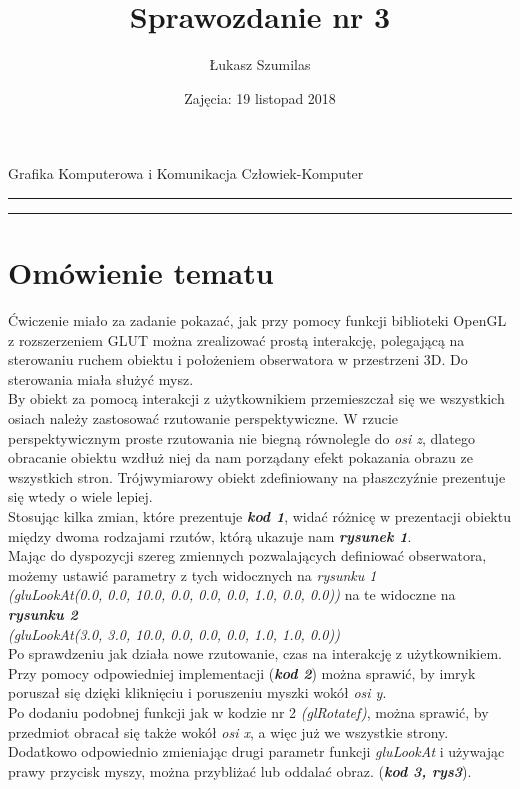 \documentclass[a4paper,11pt]{article}
\title{Sprawozdanie nr 3}
\author{Łukasz Szumilas}
\date{Zajęcia: 19 listopad 2018}
\begin{document}
  \begin{center}\Large
    Grafika Komputerowa i Komunikacja Człowiek-Komputer
  \end{center}
  \hrule
  {\let\newpage\relax\maketitle}
  \hrule


  \section{Omówienie tematu}
  Ćwiczenie miało za zadanie pokazać, jak przy pomocy funkcji biblioteki OpenGL z rozszerzeniem GLUT można zrealizować prostą interakcję, polegającą na sterowaniu ruchem obiektu i położeniem obserwatora w przestrzeni 3D. Do sterowania miała służyć mysz.
\\\indent By obiekt za pomocą interakcji z użytkownikiem przemieszczał się we wszystkich osiach należy zastosować rzutowanie perspektywiczne. W rzucie perspektywicznym proste rzutowania nie biegną równolegle do \textit{osi z}, dlatego obracanie obiektu wzdłuż niej da nam porządany efekt pokazania obrazu ze wszystkich stron. Trójwymiarowy obiekt zdefiniowany na płaszczyźnie prezentuje się wtedy o wiele lepiej.
\\\indent Stosując kilka zmian, które prezentuje \textbf{\textit{kod 1}}, widać różnicę w prezentacji obiektu między dwoma rodzajami rzutów, którą ukazuje nam \textbf{\textit{rysunek 1}}. 
\\\indent Mając do dyspozycji szereg zmiennych pozwalających definiować obserwatora, możemy ustawić parametry z tych widocznych na \textit{rysunku 1 \\(gluLookAt(0.0, 0.0, 10.0, 0.0, 0.0, 0.0, 1.0, 0.0, 0.0))} na te widoczne na \textit{\textbf{rysunku 2}\\(gluLookAt(3.0, 3.0, 10.0, 0.0, 0.0, 0.0, 1.0, 1.0, 0.0))}
\\\indent Po sprawdzeniu jak działa nowe rzutowanie, czas na interakcję z użytkownikiem. Przy pomocy odpowiedniej implementacji (\textbf{\textit{kod 2}}) można sprawić, by imryk poruszał się dzięki kliknięciu i poruszeniu myszki wokół \textit{osi y}.
\\\indent Po dodaniu podobnej funkcji jak w kodzie nr 2 \textit{(glRotatef)}, można sprawić, by przedmiot obracał się także wokół \textit{osi x}, a więc już we wszystkie strony. Dodatkowo odpowiednio zmieniając drugi parametr funkcji \textit{gluLookAt} i używając prawy przycisk myszy, można przybliżać lub oddalać obraz.  (\textbf{\textit{kod 3, rys3}}).
\end{document}
